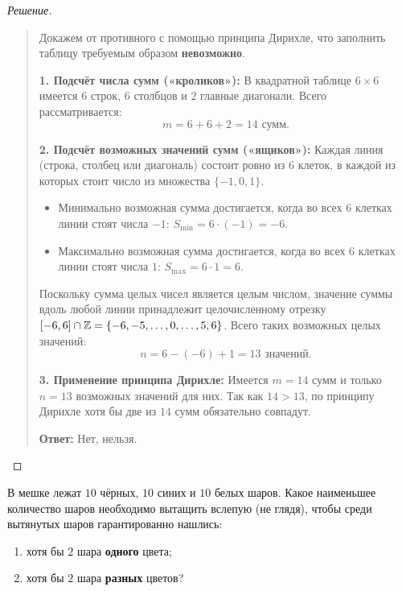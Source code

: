 \begin{proof}[Решение]~\\
    \begin{quote}
        Докажем от противного с помощью принципа Дирихле, что заполнить 
        таблицу требуемым образом \textbf{невозможно}.

        \textbf{1. Подсчёт числа сумм («кроликов»):} 
        В квадратной таблице $6 \times 6$ имеется $6$ строк, $6$ столбцов и 
        $2$ главные диагонали. Всего рассматривается:
        \[
            m = 6 + 6 + 2 = 14 \text{ сумм.}
        \]

        \textbf{2. Подсчёт возможных значений сумм («ящиков»):} 
        Каждая линия (строка, столбец или диагональ) состоит ровно из $6$ 
        клеток, в каждой из которых стоит число из множества $\{-1, 0, 1\}$.
        \begin{itemize}
            \item Минимально возможная сумма достигается, когда во всех $6$ 
            клетках линии стоят числа $-1$: $S_{\min} = 6 \cdot (-1) = -6$.
            \item Максимально возможная сумма достигается, когда во всех $6$ 
            клетках линии стоят числа $1$: $S_{\max} = 6 \cdot 1 = 6$.
        \end{itemize}
        Поскольку сумма целых чисел является целым числом, значение суммы 
        вдоль любой линии принадлежит целочисленному отрезку 
        $[-6, 6] \cap \mathbb{Z} = \{-6, -5, \dots, 0, \dots, 5, 6\}$. Всего таких 
        возможных целых значений:
        \[
            n = 6 - (-6) + 1 = 13 \text{ значений.}
        \]

        \textbf{3. Применение принципа Дирихле:} 
        Имеется $m = 14$ сумм и только $n = 13$ возможных значений для них. 
        Так как $14 > 13$, по принципу Дирихле хотя бы две из $14$ сумм 
        обязательно совпадут.
        
        \textbf{Ответ:} Нет, нельзя.
    \end{quote}
\end{proof}

\begin{problem}
    В мешке лежат $10$ чёрных, $10$ синих и $10$ белых шаров. Какое 
    наименьшее количество шаров необходимо вытащить вслепую (не глядя), 
    чтобы среди вытянутых шаров гарантированно нашлись:
    \begin{enumerate}
        \item хотя бы $2$ шара \textbf{одного} цвета;
        \item хотя бы $2$ шара \textbf{разных} цветов?
    \end{enumerate}
\end{problem}

